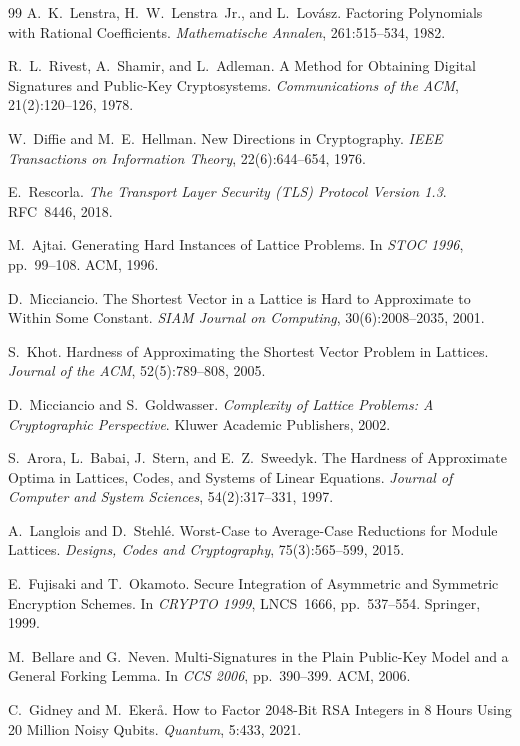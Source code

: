 ﻿\documentclass[a4paper,12pt]{article}
\theoremstyle{definition}
\begin{document}
\begin{thebibliography}{99}
A.\ K.\ Lenstra, H.\ W.\ Lenstra~Jr., and L.\ Lov\'asz. Factoring Polynomials with Rational Coefficients. \textit{Mathematische Annalen}, 261:515--534, 1982.

R.\ L.\ Rivest, A.\ Shamir, and L.\ Adleman. A Method for Obtaining Digital Signatures and Public-Key Cryptosystems. \textit{Communications of the ACM}, 21(2):120--126, 1978.

W.\ Diffie and M.\ E.\ Hellman. New Directions in Cryptography. \textit{IEEE Transactions on Information Theory}, 22(6):644--654, 1976.

E.\ Rescorla. \textit{The Transport Layer Security (TLS) Protocol Version 1.3}. RFC~8446, 2018.

M.\ Ajtai. Generating Hard Instances of Lattice Problems. In \textit{STOC 1996}, pp.~99--108. ACM, 1996.

D.\ Micciancio. The Shortest Vector in a Lattice is Hard to Approximate to Within Some Constant. \textit{SIAM Journal on Computing}, 30(6):2008--2035, 2001.

S.\ Khot. Hardness of Approximating the Shortest Vector Problem in Lattices. \textit{Journal of the ACM}, 52(5):789--808, 2005.

D.\ Micciancio and S.\ Goldwasser. \textit{Complexity of Lattice Problems: A Cryptographic Perspective}. Kluwer Academic Publishers, 2002.

S.\ Arora, L.\ Babai, J.\ Stern, and E.\ Z.\ Sweedyk. The Hardness of Approximate Optima in Lattices, Codes, and Systems of Linear Equations. \textit{Journal of Computer and System Sciences}, 54(2):317--331, 1997.

A.\ Langlois and D.\ Stehl\'e. Worst-Case to Average-Case Reductions for Module Lattices. \textit{Designs, Codes and Cryptography}, 75(3):565--599, 2015.

E.\ Fujisaki and T.\ Okamoto. Secure Integration of Asymmetric and Symmetric Encryption Schemes. In \textit{CRYPTO 1999}, LNCS~1666, pp.~537--554. Springer, 1999.

M.\ Bellare and G.\ Neven. Multi-Signatures in the Plain Public-Key Model and a General Forking Lemma. In \textit{CCS 2006}, pp.~390--399. ACM, 2006.

C.\ Gidney and M.\ Eker\aa. How to Factor 2048-Bit RSA Integers in 8 Hours Using 20 Million Noisy Qubits. \textit{Quantum}, 5:433, 2021.


\end{thebibliography}
\end{document}
